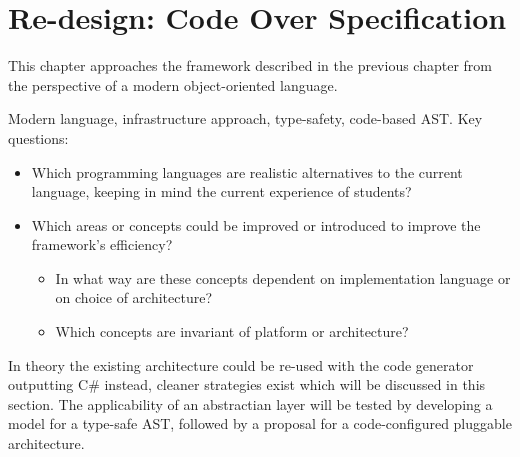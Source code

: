 \documentclass[twoside,openright]{uva-bachelor-thesis}
\begin{document}

	
	
	
\chapter{Re-design: Code Over Specification}
	This chapter approaches the framework described in the previous chapter from the perspective of a modern object-oriented language.

	Modern language, infrastructure approach, type-safety, code-based AST. Key questions:
	\begin{itemize}
		\item Which programming languages are realistic alternatives to the current language, keeping in mind the current experience of students?
		\item Which areas or concepts could be improved or introduced to improve the framework's efficiency?
		\begin{itemize}
			\item In what way are these concepts dependent on implementation language or on choice of architecture?
			\item Which concepts are invariant of platform or architecture?
		\end{itemize}
	\end{itemize}
	
	In theory the existing architecture could be re-used with the code generator outputting C\# instead, cleaner strategies exist which will be discussed in this section. The applicability of an abstractian layer will be tested by developing a model for a type-safe AST, followed by a proposal for a code-configured pluggable architecture.
		
\end{document}
